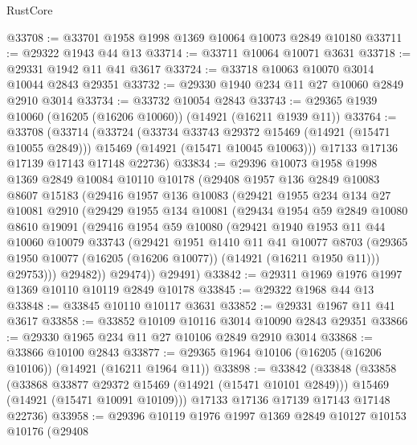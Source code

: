 \begin{lexlean}{RustCore}
\begin{coremodule}
@33708 := @33701 @1958 @1998 @1369 @10064 @10073 @2849 @10180
@33711 := @29322 @1943 @44 @13
@33714 := @33711 @10064 @10071 @3631
@33718 := @29331 @1942 @11 @41 @3617
@33724 := @33718 @10063 @10070 @3014 @10044 @2843 @29351
@33732 := @29330 @1940 @234 @11 @27 @10060 @2849 @2910 @3014
@33734 := @33732 @10054 @2843
@33743 := @29365 @1939 @10060 (@16205 (@16206 @10060)) (@14921 (@16211 @1939 @11))
@33764 := @33708
    (@33714
      (@33724
        (@33734 @33743 @29372 @15469 (@14921 (@15471 @10055 @2849)))
        @15469
        (@14921 (@15471 @10045 @10063)))
      @17133
      @17136
      @17139
      @17143
      @17148
      @22736)
@33834 := @29396
    @10073
    @1958
    @1998
    @1369
    @2849
    @10084
    @10110
    @10178
    (@29408
      @1957
      @136
      @2849
      @10083
      @8607
      @15183
      (@29416
        @1957
        @136
        @10083
        (@29421
          @1955
          @234
          @134
          @27
          @10081
          @2910
          (@29429
            @1955
            @134
            @10081
            (@29434
              @1954
              @59
              @2849
              @10080
              @8610
              @19091
              (@29416
                @1954
                @59
                @10080
                (@29421
                  @1940
                  @1953
                  @11
                  @44
                  @10060
                  @10079
                  @33743
                  (@29421
                    @1951
                    @1410
                    @11
                    @41
                    @10077
                    @8703
                    (@29365 @1950 @10077 (@16205 (@16206 @10077)) (@14921 (@16211 @1950 @11)))
                    @29753)))
              @29482))
          @29474))
      @29491)
@33842 := @29311 @1969 @1976 @1997 @1369 @10110 @10119 @2849 @10178
@33845 := @29322 @1968 @44 @13
@33848 := @33845 @10110 @10117 @3631
@33852 := @29331 @1967 @11 @41 @3617
@33858 := @33852 @10109 @10116 @3014 @10090 @2843 @29351
@33866 := @29330 @1965 @234 @11 @27 @10106 @2849 @2910 @3014
@33868 := @33866 @10100 @2843
@33877 := @29365 @1964 @10106 (@16205 (@16206 @10106)) (@14921 (@16211 @1964 @11))
@33898 := @33842
    (@33848
      (@33858
        (@33868 @33877 @29372 @15469 (@14921 (@15471 @10101 @2849)))
        @15469
        (@14921 (@15471 @10091 @10109)))
      @17133
      @17136
      @17139
      @17143
      @17148
      @22736)
@33958 := @29396
    @10119
    @1976
    @1997
    @1369
    @2849
    @10127
    @10153
    @10176
    (@29408

\end{coremodule}
\end{lexlean}
